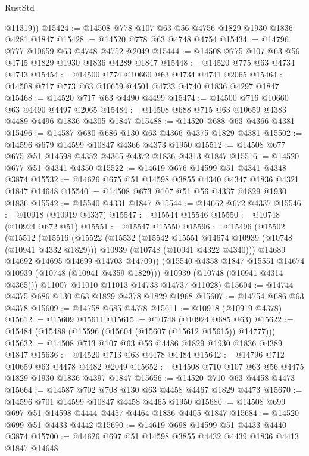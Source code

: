 \begin{lexlean}{RustStd}
\begin{coremodule}
        @11319))
@15424 := @14508 @778 @107 @63 @56 @4756 @1829 @1930 @1836 @4281 @1847
@15428 := @14520 @778 @63 @4748 @4754
@15434 := @14796 @777 @10659 @63 @4748 @4752 @2049
@15444 := @14508 @775 @107 @63 @56 @4745 @1829 @1930 @1836 @4289 @1847
@15448 := @14520 @775 @63 @4734 @4743
@15454 := @14500 @774 @10660 @63 @4734 @4741 @2065
@15464 := @14508 @717 @773 @63 @10659 @4501 @4733 @4740 @1836 @4297 @1847
@15468 := @14520 @717 @63 @4490 @4499
@15474 := @14500 @716 @10660 @63 @4490 @4497 @2065
@15484 := @14508 @688 @715 @63 @10659 @4383 @4489 @4496 @1836 @4305 @1847
@15488 := @14520 @688 @63 @4366 @4381
@15496 := @14587 @680 @686 @130 @63 @4366 @4375 @1829 @4381
@15502 := @14596 @679 @14599 @10847 @4366 @4373 @1950
@15512 := @14508 @677 @675 @51 @14598 @4352 @4365 @4372 @1836 @4313 @1847
@15516 := @14520 @677 @51 @4341 @4350
@15522 := @14619 @676 @14599 @51 @4341 @4348 @3874
@15532 := @14626 @675 @51 @14598 @3855 @4340 @4347 @1836 @4321 @1847 @14648
@15540 := @14508 @673 @107 @51 @56 @4337 @1829 @1930 @1836
@15542 := @15540 @4331 @1847
@15544 := @14662 @672 @4337
@15546 := @10918 (@10919 @4337)
@15547 := @15544 @15546
@15550 := @10748 (@10924 @672 @51)
@15551 := @15547 @15550
@15596 := @15496
    (@15502
      (@15512
        (@15516
          (@15522
            (@15532
              (@15542 @15551 @14674 @10939 (@10748 (@10941 @4332 @1829)))
              @10939
              (@10748 (@10941 @4322 @4340)))
            @14689
            @14692
            @14695
            @14699
            @14703
            @14709))
        (@15540 @4358 @1847 @15551 @14674 @10939 (@10748 (@10941 @4359 @1829)))
        @10939
        (@10748 (@10941 @4314 @4365)))
      @11007
      @11010
      @11013
      @14733
      @14737
      @11028)
@15604 := @14744 @4375 @686 @130 @63 @1829 @4378 @1829 @1968
@15607 := @14754 @686 @63 @4378
@15609 := @14758 @685 @4378
@15611 := @10918 (@10919 @4378)
@15612 := @15609 @15611
@15615 := @10748 (@10924 @685 @63)
@15622 := @15484 (@15488 (@15596 (@15604 (@15607 (@15612 @15615)) @14777)))
@15632 := @14508 @713 @107 @63 @56 @4486 @1829 @1930 @1836 @4389 @1847
@15636 := @14520 @713 @63 @4478 @4484
@15642 := @14796 @712 @10659 @63 @4478 @4482 @2049
@15652 := @14508 @710 @107 @63 @56 @4475 @1829 @1930 @1836 @4397 @1847
@15656 := @14520 @710 @63 @4458 @4473
@15664 := @14587 @702 @708 @130 @63 @4458 @4467 @1829 @4473
@15670 := @14596 @701 @14599 @10847 @4458 @4465 @1950
@15680 := @14508 @699 @697 @51 @14598 @4444 @4457 @4464 @1836 @4405 @1847
@15684 := @14520 @699 @51 @4433 @4442
@15690 := @14619 @698 @14599 @51 @4433 @4440 @3874
@15700 := @14626 @697 @51 @14598 @3855 @4432 @4439 @1836 @4413 @1847 @14648

\end{coremodule}
\end{lexlean}
